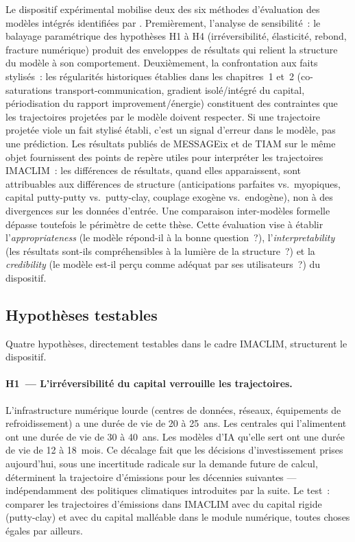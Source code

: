 Le dispositif expérimental mobilise deux des six méthodes d'évaluation des modèles intégrés identifiées par \textcite{wilson_evaluating_2021}. Premièrement, l'analyse de sensibilité~: le balayage paramétrique des hypothèses H1 à H4 (irréversibilité, élasticité, rebond, fracture numérique) produit des enveloppes de résultats qui relient la structure du modèle à son comportement. Deuxièmement, la confrontation aux faits stylisés~: les régularités historiques établies dans les chapitres~1 et~2 (co-saturations transport-communication, gradient isolé/intégré du capital, périodisation du rapport improvement/énergie) constituent des contraintes que les trajectoires projetées par le modèle doivent respecter. Si une trajectoire projetée viole un fait stylisé établi, c'est un signal d'erreur dans le modèle, pas une prédiction. Les résultats publiés de MESSAGEix \parencite{wilson_impacts_2026} et de TIAM \parencite{beath_impacts_2026} sur le même objet fournissent des points de repère utiles pour interpréter les trajectoires IMACLIM~: les différences de résultats, quand elles apparaissent, sont attribuables aux différences de structure (anticipations parfaites vs.~myopiques, capital putty-putty vs.~putty-clay, couplage exogène vs.~endogène), non à des divergences sur les données d'entrée. Une comparaison inter-modèles formelle dépasse toutefois le périmètre de cette thèse. Cette évaluation vise à établir l'\emph{appropriateness} (le modèle répond-il à la bonne question~?), l'\emph{interpretability} (les résultats sont-ils compréhensibles à la lumière de la structure~?) et la \emph{credibility} (le modèle est-il perçu comme adéquat par ses utilisateurs~?) du dispositif.


\subsection{Hypothèses testables}\label{sec:ch4-soustheses}

Quatre hypothèses, directement testables dans le cadre IMACLIM, structurent le dispositif.

\paragraph{H1~--- L'irréversibilité du capital verrouille les trajectoires.}
L'infrastructure numérique lourde (centres de données, réseaux, équipements de refroidissement) a une durée de vie de 20 à 25~ans. Les centrales qui l'alimentent ont une durée de vie de 30 à 40~ans. Les modèles d'IA qu'elle sert ont une durée de vie de 12 à 18~mois. Ce décalage fait que les décisions d'investissement prises aujourd'hui, sous une incertitude radicale sur la demande future de calcul, déterminent la trajectoire d'émissions pour les décennies suivantes --- indépendamment des politiques climatiques introduites par la suite. Le test~: comparer les trajectoires d'émissions dans IMACLIM avec du capital rigide (putty-clay) et avec du capital malléable dans le module numérique, toutes choses égales par ailleurs.

